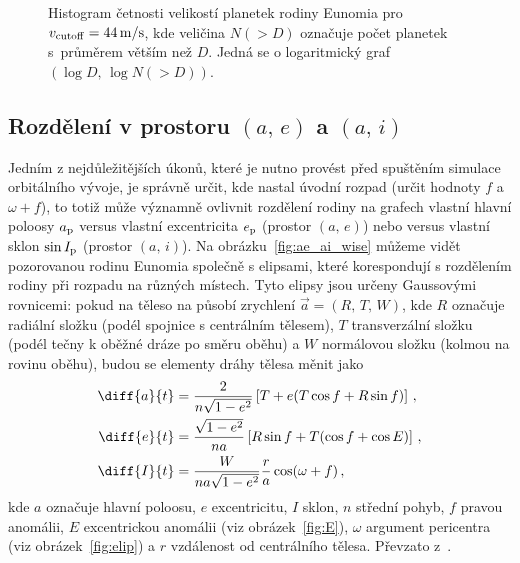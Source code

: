 \documentclass[A4paper, 12pt, oneside]{book}
\begin{document}
\begin{figure}
\begin{subfigure}[b]{0.45\textwidth}
	\end{subfigure}
	\caption{Histogram četnosti velikostí planetek rodiny Eunomia pro $v_{\rm cutoff}=44\,{\rm m/s}$, kde veličina $N({>}D)$ označuje počet planetek s~průměrem větším než $D$. Jedná se o logaritmický graf $(\log D,\,\log N({>}D))$.}
	\label{size_distribution}
\end{figure}
\subsection{Rozdělení v prostoru $(a,\,e)$ a $(a,\,i)$}
Jedním z nejdůležitějších úkonů, které je nutno provést před spuštěním simulace orbitálního vývoje, je správně určit, kde nastal úvodní rozpad (určit hodnoty $f$ a $\omega+f$), to totiž může významně ovlivnit rozdělení rodiny na grafech vlastní hlavní poloosy $a_{\rm p}$ versus vlastní excentricita $e_{\rm p}$ (prostor $(a,\,e)$) nebo versus vlastní sklon $\sin I_{\rm p}$ (prostor $(a,\,i)$). Na obrázku~\ref{fig:ae_ai_wise} můžeme vidět pozorovanou rodinu Eunomia společně s elipsami, které korespondují s rozdělením rodiny při rozpadu na různých místech. Tyto elipsy jsou určeny Gaussovými rovnicemi: pokud na těleso na působí zrychlení $\vec{a}=(R,\,T,\,W)$, kde $R$ označuje radiální složku (podél spojnice s centrálním tělesem), $T$ transverzální složku (podél tečny k oběžné dráze po směru oběhu) a $W$ normálovou složku (kolmou na rovinu oběhu), budou se elementy dráhy tělesa měnit jako
\begin{align}
	\diff{a}{t}&=\frac{2}{n\sqrt{1-e^2}}\left[T+e(T\cos f+R\sin f)\right] \,, \\
	\diff{e}{t}&=\frac{\sqrt{1-e^2}}{na}\left[R\sin f+T(\cos f+\cos E)\right]\,, \\
	\diff{I}{t}&=\frac{W}{na\sqrt{1-e^2}}\frac{r}{a}\cos(\omega+f)\,,
\end{align}
kde $a$ označuje hlavní poloosu, $e$ excentricitu, $I$ sklon, $n$ střední pohyb, $f$ pravou anomálii, $E$ excentrickou anomálii (viz obrázek~\ref{fig:E}), $\omega$ argument pericentra (viz obrázek~\ref{fig:elip}) a $r$ vzdálenost od centrálního tělesa. Převzato z~\cite{fmt}.
\end{document}
